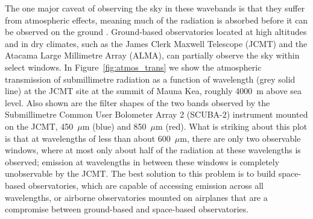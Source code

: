 The one major caveat of observing the sky in these wavebands is that they suffer from atmospheric effects, meaning much of the radiation is absorbed before it can be observed on the ground \citep[e.g.][]{2013MNRAS.430.2513H}.  Ground-based observatories located at high altitudes and in dry climates, such as the James Clerk Maxwell Telescope (JCMT) and the Atacama Large Millimetre Array (ALMA), can partially observe the sky within select windows.  In Figure~\ref{fig:atmos_trans} we show the atmospheric transmission of submillimetre radiation as a function of wavelength (grey solid line) at the JCMT site at the summit of Mauna Kea, roughly 4000~m above sea level.  Also shown are the filter shapes of the two bands observed by the Submillimetre Common User Bolometer Array 2 (SCUBA-2) instrument mounted on the JCMT, 450~$\mu$m (blue) and 850~$\mu$m (red).  What is striking about this plot is that at wavelengths of less than about 600~$\mu$m, there are only two observable windows, where at most only about half of the radiation at these wavelengths is observed; emission at wavelengths in between these windows is completely unobservable by the JCMT.  The best solution to this problem is to build space-based observatories, which are capable of accessing emission across all wavelengths, or airborne observatories mounted on airplanes that are a compromise between ground-based and space-based observatories. 


